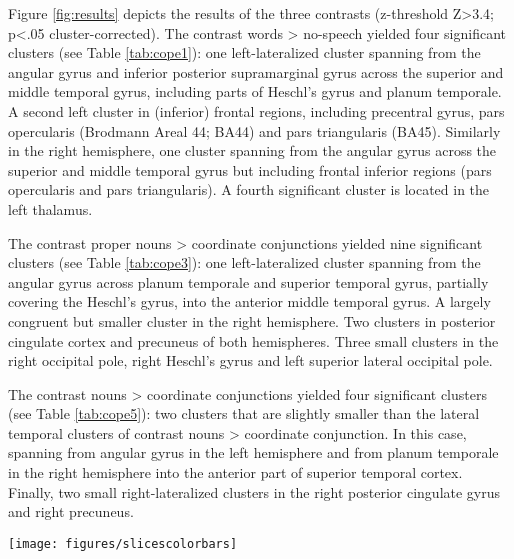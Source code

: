 \documentclass[10pt,a4paper,onecolumn]{article}
\begin{document}
Figure \ref{fig:results} depicts the results of the three contrasts (z-threshold
Z>3.4; p<.05 cluster-corrected).
The contrast words > no-speech yielded four significant clusters (see Table
\ref{tab:cope1}):
one left-lateralized cluster spanning from the angular gyrus and inferior
posterior supramarginal gyrus across the superior and middle temporal gyrus,
including parts of Heschl's gyrus and planum temporale.
A second left cluster in (inferior) frontal regions, including precentral gyrus,
pars opercularis (Brodmann Areal 44; BA44) and pars triangularis (BA45).
Similarly in the right hemisphere, one cluster spanning from the angular gyrus
across the superior and middle temporal gyrus but including frontal inferior
regions (pars opercularis and pars triangularis).
A fourth significant cluster is located in the left thalamus.

The contrast proper nouns > coordinate conjunctions yielded nine significant
clusters (see Table \ref{tab:cope3}):
one left-lateralized cluster spanning from the angular gyrus across planum
temporale and superior temporal gyrus, partially covering the Heschl's gyrus,
into the anterior middle temporal gyrus.
A largely congruent but smaller cluster in the right hemisphere.
Two clusters in posterior cingulate cortex and precuneus of both hemispheres.
Three small clusters in the right occipital pole, right Heschl's gyrus and left
superior lateral occipital pole.

The contrast nouns > coordinate conjunctions yielded four significant clusters
(see Table \ref{tab:cope5}):
two clusters that are slightly smaller than the lateral temporal clusters of
contrast nouns > coordinate conjunction.
In this case, spanning from angular gyrus in the left hemisphere and from planum
temporale in the right hemisphere into the anterior part of superior temporal
cortex.
Finally, two small right-lateralized clusters in the right posterior cingulate
gyrus and right precuneus.


\begin{figure*} \centering
    \texttt{[image: figures/slicescolorbars]}
    \caption{Results of the mixed-effects group-level (N=14) GLM $t$-contrasts
        for the audio-description of the movie ``Forrest Gump''.
        Significant clusters (Z>3.4, p<0.05 cluster-corrected) are overlaid on
        the MNI152 T1-weighted head template (grey).
        Light grey: The audio-description's field-of-view
        (cf. \citep{hanke2014audiomovie}).}
    \label{fig:results}
\end{figure*}
\end{document}
